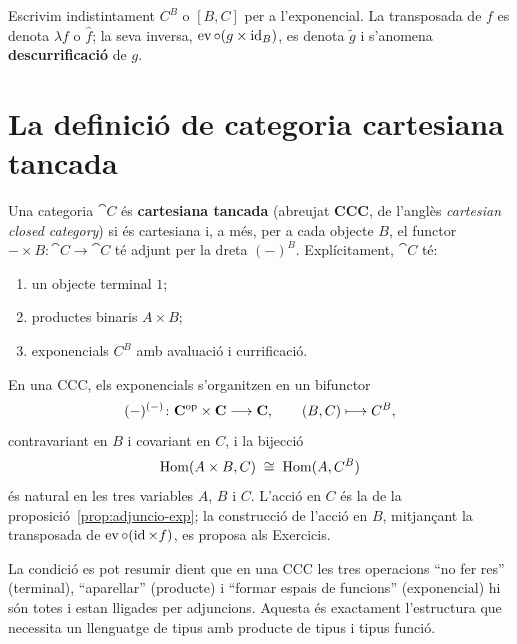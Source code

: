 \begin{notacio}
Escrivim indistintament $C^{B}$ o $[B,C]$ per a l'exponencial. La transposada de $f$ es denota $\lambda f$ o $\widehat f$; la seva inversa, $\operatorname{ev}\circ(g\times\operatorname{id}_B)$, es denota $\widetilde g$ i s'anomena \textbf{descurrificació} de $g$.
\end{notacio}

\section{La definició de categoria cartesiana tancada}

\begin{definicio}
\label{def:ccc}
Una categoria $\cat{C}$ és \textbf{cartesiana tancada} (abreujat \textbf{CCC}, de l'anglès \emph{cartesian closed category}) si és cartesiana i, a més, per a cada objecte $B$, el functor $-\times B\colon\cat{C}\to\cat{C}$ té adjunt per la dreta $(-)^{B}$. Explícitament, $\cat{C}$ té:
\begin{enumerate}
\item un objecte terminal $1$;
\item productes binaris $A\times B$;
\item exponencials $C^{B}$ amb avaluació i currificació.
\end{enumerate}
\end{definicio}

\begin{observacio}\label{obs:exponencial-bifunctor}
En una CCC, els exponencials s'organitzen en un bifunctor
\[
(-)^{(-)}\colon\mathbf{C}^{\mathrm{op}}\times\mathbf{C}\longrightarrow\mathbf{C},
\qquad (B,C)\longmapsto C^{B},
\]
contravariant en $B$ i covariant en $C$, i la bijecció
\[
\operatorname{Hom}(A\times B,C)\;\cong\;\operatorname{Hom}(A,C^{B})
\]
és natural en les tres variables $A$, $B$ i $C$. L'acció en $C$ és la de la proposició~\ref{prop:adjuncio-exp}; la construcció de l'acció en $B$, mitjançant la transposada de $\operatorname{ev}\circ(\operatorname{id}\times f)$, es proposa als Exercicis.
\end{observacio}

La condició es pot resumir dient que en una CCC les tres operacions \enquote{no fer res} (terminal), \enquote{aparellar} (producte) i \enquote{formar espais de funcions} (exponencial) hi són totes i estan lligades per adjuncions. Aquesta és exactament l'estructura que necessita un llenguatge de tipus amb producte de tipus i tipus funció.

